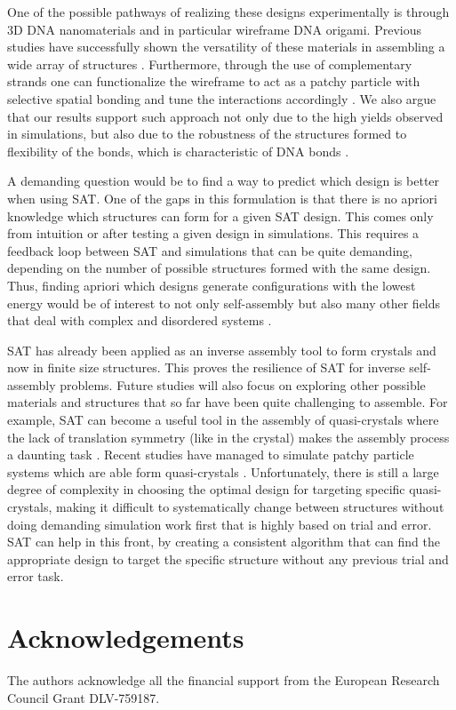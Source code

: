 \documentclass[a4paper, amsfonts, amssymb, amsmath, reprint, showkeys, nofootinbib, twoside]{revtex4-1}
\begin{document}
One of the possible pathways of realizing these designs experimentally is through 3D DNA nanomaterials and in particular wireframe DNA origami. Previous studies have successfully shown the versatility of these materials in assembling a wide array of structures \cite{Mosayebi2017, Lee2022, Jun2021, Rothemund2006}. Furthermore, through the use of complementary strands one can functionalize the wireframe to act as a patchy particle with selective spatial bonding and tune the interactions accordingly \cite{Biancaniello2005, Wang2015}. We also argue that our results support such approach not only due to the high yields observed in simulations, but also due to the robustness of the structures formed to flexibility of the bonds, which is characteristic of DNA bonds \cite{Meulen2015, Meulen2015, Geerts2010}.

A demanding question would be to find a way to predict which design is better when using SAT. One of the gaps in this formulation is that there is no apriori knowledge which structures can form for a given SAT design. This comes only from intuition or after testing a given design in simulations. This requires a feedback loop between SAT and simulations that can be quite demanding, depending on the number of possible structures formed with the same design. Thus, finding apriori which designs generate configurations with the lowest energy would be of interest to not only self-assembly but also many other fields that deal with complex and disordered systems \cite{Franz2017}.

SAT has already been applied as an inverse assembly tool to form crystals and now in finite size structures. This proves the resilience of SAT for inverse self-assembly problems. Future studies will also focus on exploring other possible materials and structures that so far have been quite challenging to assemble. For example, SAT can become a useful tool in the assembly of quasi-crystals where the lack of translation symmetry (like in the crystal) makes the assembly process a daunting task \cite{Shechtman1984}. Recent studies have managed to simulate patchy particle systems which are able form quasi-crystals \cite{Noya2021}. Unfortunately, there is still a large degree of complexity in choosing the optimal design for targeting specific quasi-crystals, making it difficult to systematically change between structures without doing demanding simulation work first that is highly based on trial and error. SAT can help in this front, by creating a consistent algorithm that can find the appropriate design to target the specific structure without any previous trial and error task.

\section{Acknowledgements}

The authors acknowledge all the financial support from the European Research Council Grant DLV-759187.


\end{document}
